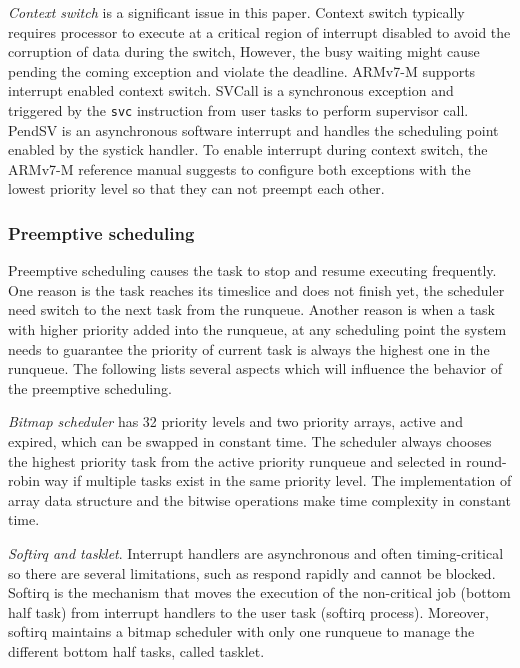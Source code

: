 \textit{Context switch} is a significant issue in this paper. Context switch typically requires processor to execute at a critical region of interrupt disabled to avoid the corruption of data during the switch, However, the busy waiting might cause pending the coming exception and violate the deadline. ARMv7-M supports interrupt enabled context switch. SVCall is a synchronous exception and triggered by the \texttt{svc} instruction from user tasks to perform supervisor call. PendSV is an asynchronous software interrupt and handles the scheduling point enabled by the systick handler. To enable interrupt during context switch, the ARMv7-M reference manual suggests to configure both exceptions with the lowest priority level so that they can not preempt each other.

\subsubsection{Preemptive scheduling}
Preemptive scheduling causes the task to stop and resume executing frequently. One reason is the task reaches its timeslice and does not finish yet, the scheduler need switch to the next task from the runqueue. Another reason is when a task with higher priority added into the runqueue, at any scheduling point the system needs to guarantee the priority of current task is always the highest one in the runqueue. The following lists several aspects which will influence the behavior of the preemptive scheduling.

\textit{Bitmap scheduler} has 32 priority levels and two priority arrays, active and expired, which can be swapped in constant time. The scheduler always chooses the highest priority task from the active priority runqueue and selected in round-robin way if multiple tasks exist in the same priority level. The implementation of array data structure and the bitwise operations make time complexity in constant time.

\textit{Softirq and tasklet}. Interrupt handlers are asynchronous and often timing-critical so there are several limitations, such as respond rapidly and cannot be blocked. Softirq is the mechanism that moves the execution of the non-critical job (bottom half task) from interrupt handlers to the user task (softirq process). Moreover, softirq maintains a bitmap scheduler with only one runqueue to manage the different bottom half tasks, called tasklet.

